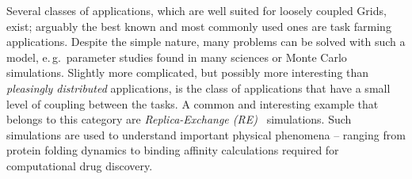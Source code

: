 \documentclass[times, 10pt, twocolumn]{article}
\newcommand{\kimnote}[1]{ {\textcolor{green} { ***JK: #1 }}}
\newcommand{\jhanote}[1]{ {\textcolor{red} { ***SJ: #1 }}}
\newcommand{\kimnote}[1]{}
\newcommand{\jhanote}[1]{}
\newcommand{\up}{\vspace*{-1em}}
\begin{document}
\begin{abstract}
\end{abstract}

\up
{}
                           
\up
Several classes of applications, which are well suited for loosely
coupled Grids, exist; arguably the best known and most commonly used
ones are task farming applications. Despite the simple nature, many
problems can be solved with such a model, e.\,g.\ parameter studies
found in many sciences or Monte Carlo simulations. Slightly more
complicated, but possibly more interesting than {\it pleasingly
  distributed} applications, is the class of applications that have a
small level of coupling between the tasks.
A common and interesting example that belongs to this category are
\emph{Replica-Exchange (RE)}~\cite{hansmann,Sugita:1999rm} simulations.
Such simulations are used to understand important physical phenomena
-- ranging from protein folding dynamics to binding affinity
calculations required for computational drug discovery.

  

              
\end{document}
